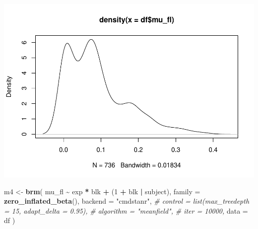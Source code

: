 \documentclass[
]{article}
\newenvironment{Shaded}{\begin{snugshade}}{\end{snugshade}}
\newcommand{\AttributeTok}[1]{\textcolor[rgb]{0.13,0.29,0.53}{#1}}
\newcommand{\CommentTok}[1]{\textcolor[rgb]{0.56,0.35,0.01}{\textit{#1}}}
\newcommand{\DecValTok}[1]{\textcolor[rgb]{0.00,0.00,0.81}{#1}}
\newcommand{\FunctionTok}[1]{\textcolor[rgb]{0.13,0.29,0.53}{\textbf{#1}}}
\newcommand{\NormalTok}[1]{#1}
\newcommand{\OtherTok}[1]{\textcolor[rgb]{0.56,0.35,0.01}{#1}}
\newcommand{\SpecialCharTok}[1]{\textcolor[rgb]{0.81,0.36,0.00}{\textbf{#1}}}
\newcommand{\StringTok}[1]{\textcolor[rgb]{0.31,0.60,0.02}{#1}}
\begin{document}
\begin{Shaded}
\end{Shaded}

\includegraphics{params_analyses_files/figure-latex/unnamed-chunk-5-1.pdf}

\begin{Shaded}
\begin{Highlighting}[]
\NormalTok{m4 }\OtherTok{\textless{}{-}} \FunctionTok{brm}\NormalTok{(}
\NormalTok{  mu\_fl }\SpecialCharTok{\textasciitilde{}}\NormalTok{ exp }\SpecialCharTok{*}\NormalTok{ blk }\SpecialCharTok{+}\NormalTok{ (}\DecValTok{1} \SpecialCharTok{+}\NormalTok{ blk }\SpecialCharTok{|}\NormalTok{ subject),}
  \AttributeTok{family =} \FunctionTok{zero\_inflated\_beta}\NormalTok{(),}
  \AttributeTok{backend =} \StringTok{"cmdstanr"}\NormalTok{,}
  \CommentTok{\# control = list(max\_treedepth = 15, adapt\_delta = 0.95),}
  \CommentTok{\# algorithm = "meanfield",}
  \CommentTok{\# iter = 10000,}
  \AttributeTok{data =}\NormalTok{ df}
\NormalTok{)}
\end{Highlighting}
\end{Shaded}
\end{document}
